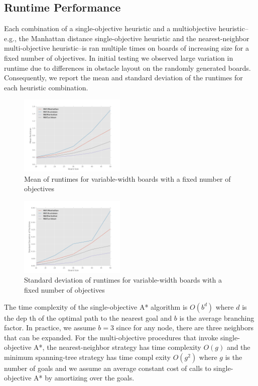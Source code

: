 \documentclass[12pt, conference, compsocconf]{IEEEtran}
\begin{document}
\subsection{Runtime Performance}
Each combination of a single-objective heuristic and a multiobjective heuristic--e.g., the Manhattan distance single-objective heuristic and the nearest-neighbor multi-objective heuristic--is ran multiple times on boards of increasing size for a fixed number of objectives.
In initial testing we observed large variation in runtime due to differences in obstacle layout on the randomly generated boards. 
Consequently, we report the mean and standard deviation of the runtimes for each heuristic combination. 

\begin{figure}[h!]
    \centering
    \includegraphics[width=0.45\textwidth]{runtimes.png}
    \caption{Mean of runtimes for variable-width boards with a fixed number of objectives}
    \label{runtimes-fig}
\end{figure}

\begin{figure}[h!]
    \centering
    \includegraphics[width=0.45\textwidth]{variability.png}
    \caption{Standard deviation of runtimes for variable-width boards with a fixed number of objectives}
    \label{variability-fig}
\end{figure}

The time complexity of the single-objective A* algorithm is $O(b^d)$ where $d$ is the dep
th of the optimal path to the nearest goal and $b$ is the average branching factor.
In practice, we assume $b = 3$ since for any node, there are three neighbors that can be
expanded.
For the multi-objective procedures that invoke single-objective A*, the nearest-neighbor
strategy has time complexity $O(g)$ and the minimum spanning-tree strategy has time compl
exity $O(g^2)$ where $g$ is the number of goals and we assume an average constant cost of
 calls to single-objective A* by amortizing over the goals.
\end{document}
